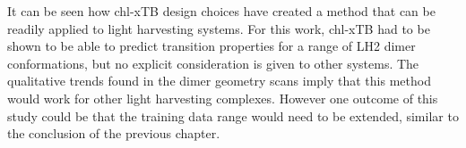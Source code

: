 It can be seen how chl-xTB design choices have created a method that can be readily 
applied to light harvesting systems. For this work, chl-xTB had to be shown to be 
able to predict transition properties for a range of LH2 dimer conformations, but 
no explicit consideration is given to other systems. The qualitative trends found 
in the dimer geometry scans imply that this method would work for other light harvesting
complexes. However one outcome of this study could be that the training data range
would need to be extended, similar to the conclusion of the previous chapter. 
